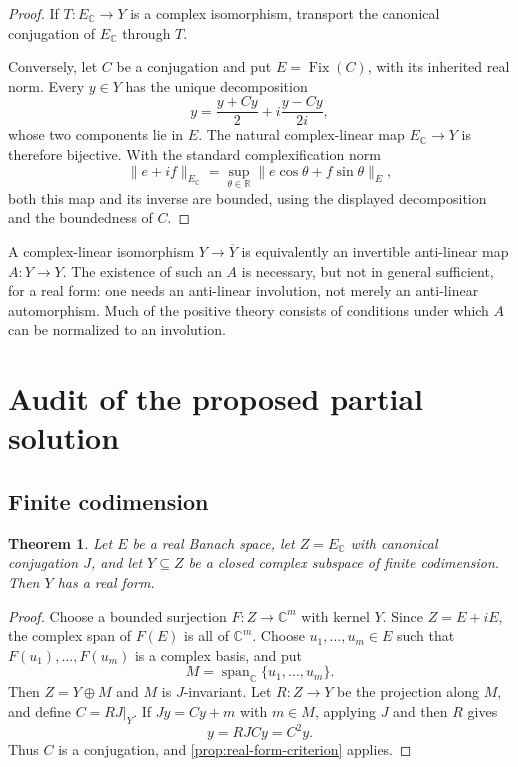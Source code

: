 \documentclass[11pt]{article}
\newtheorem{theorem}{Theorem}[section]
\theoremstyle{definition}
\theoremstyle{remark}
\newcommand{\C}{\mathbb C}
\newcommand{\R}{\mathbb R}
\newcommand{\Fix}{\operatorname{Fix}}
\begin{document}
\begin{proof}
If $T:E_{\C}\to Y$ is a complex isomorphism, transport the canonical conjugation of $E_{\C}$ through $T$.

Conversely, let $C$ be a conjugation and put $E=\Fix(C)$, with its inherited real norm. Every $y\in Y$ has the unique decomposition
\[
 y=\frac{y+Cy}{2}+i\frac{y-Cy}{2i},
\]
whose two components lie in $E$. The natural complex-linear map $E_{\C}\to Y$ is therefore bijective. With the standard complexification norm
\[
 \|e+if\|_{E_{\C}}=\sup_{\theta\in\R}\|e\cos\theta+f\sin\theta\|_E,
\]
both this map and its inverse are bounded, using the displayed decomposition and the boundedness of $C$.
\end{proof}

A complex-linear isomorphism $Y\to\overline{Y}$ is equivalently an invertible anti-linear map $A:Y\to Y$. The existence of such an $A$ is necessary, but not in general sufficient, for a real form: one needs an anti-linear involution, not merely an anti-linear automorphism. Much of the positive theory consists of conditions under which $A$ can be normalized to an involution.

\section{Audit of the proposed partial solution}

\subsection{Finite codimension}

\begin{theorem}\label{thm:finite-codim}
Let $E$ be a real Banach space, let $Z=E_{\C}$ with canonical conjugation $J$, and let $Y\subseteq Z$ be a closed complex subspace of finite codimension. Then $Y$ has a real form.
\end{theorem}

\begin{proof}
Choose a bounded surjection $F:Z\to\C^m$ with kernel $Y$. Since $Z=E+iE$, the complex span of $F(E)$ is all of $\C^m$. Choose $u_1,\dots,u_m\in E$ such that $F(u_1),\dots,F(u_m)$ is a complex basis, and put
\[
 M=\operatorname{span}_{\C}\{u_1,\dots,u_m\}.
\]
Then $Z=Y\oplus M$ and $M$ is $J$-invariant. Let $R:Z\to Y$ be the projection along $M$, and define $C=RJ|_Y$. If $Jy=Cy+m$ with $m\in M$, applying $J$ and then $R$ gives
\[
 y=RJC y=C^2y.
\]
Thus $C$ is a conjugation, and \cref{prop:real-form-criterion} applies.
\end{proof}
\end{document}
